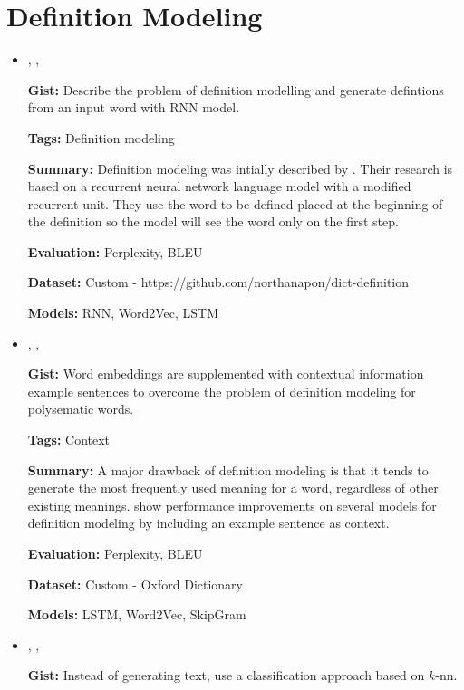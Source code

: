 \documentclass{article}[a4paper]
\newcommand{\bitem}[2]{
    \item[\cite{#1}]
        \citetitle{#1}, \citeauthor{#1}, \citeyear{#1}
        \newline
        {#2}
}%
\begin{document}
\tableofcontents

\section{Definition Modeling}
\begin{itemize}
    \bitem{noraset_definition_2016}%
    {%
        \textbf{Gist:}
        Describe the problem of definition modelling and generate defintions
        from an input word with RNN model.

        \textbf{Tags:}
        Definition modeling

        \textbf{Summary:}
        Definition modeling was intially described by
        \citeauthor{noraset_definition_2016}. Their research is based on a
        recurrent neural network language model \cite{mikolov_recurrent_2010}
        with a modified recurrent unit. They use the word to be defined placed
        at the beginning of the definition so the model will see the word only
        on the first step.

        \textbf{Evaluation:}
        Perplexity, BLEU

        \textbf{Dataset:}
        Custom - https://github.com/northanapon/dict-definition

        \textbf{Models:}
        RNN, Word2Vec, LSTM
    }%

    \bitem{gadetsky_conditional_2018}%
    {%
        \textbf{Gist:}
        Word embeddings are supplemented with contextual information example
        sentences to overcome the problem of definition modeling for polysematic
        words.

        \textbf{Tags:}
        Context

        \textbf{Summary:}
        A major drawback of definition modeling \cite{noraset_definition_2016}
        is that it tends to generate the most frequently used meaning for a
        word, regardless of other existing meanings.
        \citeauthor{gadetsky_conditional_2018} show performance improvements on
        several models for definition modeling by including an example sentence
        as context.

        \textbf{Evaluation:}
        Perplexity, BLEU

        \textbf{Dataset:}
        Custom - Oxford Dictionary

        \textbf{Models:}
        LSTM, Word2Vec, SkipGram
    }%

    \bitem{chang_what_2019}%
    {%
        \textbf{Gist:}
        Instead of generating text, use a classification approach based on
        $k$-nn.

}
\end{itemize}
\end{document}
